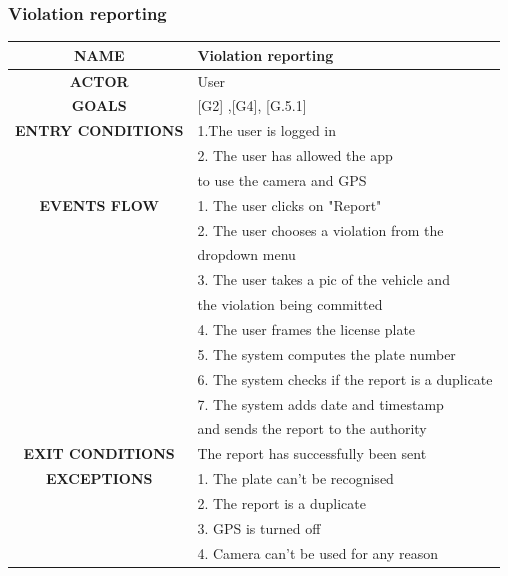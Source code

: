 \documentclass[12pt,a4paper]{article}
\begin{document}
\subsubsection{Violation reporting}
		\begin{center}
			\begin{tabular}{| c | l |}
				\hline
				\textbf{NAME} & Violation reporting \\
				\hline
				\textbf{ACTOR} & User \\
				\hline
				\textbf{GOALS} & [G2] ,[G4], [G.5.1] \\
				\hline
				\textbf{ENTRY CONDITIONS} &1.The user is logged in \\
				&2. The user has allowed the app \\
				&to use the camera and GPS \\ \hline
				\textbf{EVENTS FLOW}  &
				1. The user clicks on "Report"\\
				&2. The user chooses a violation from the \\
				& dropdown menu \\
				&3. The user takes a pic of the vehicle and \\
				& the violation being committed \\ \hline
				&4. The user frames the license plate\\
				&5. The system computes the plate number \\
				&6. The system checks if the report is a duplicate\\
				&7. The system adds date and timestamp \\
				& and sends the report to the authority \\ 
				\hline
				\textbf{EXIT CONDITIONS}  & The report has successfully been sent \\ \hline
				\textbf{EXCEPTIONS} &
				1. The plate can't be recognised \\
				&2. The report is a duplicate\\
				&3. GPS is turned off\\
				&4. Camera can't be used for any reason\\
				\hline
			\end{tabular}
		\end{center}
\end{document}
